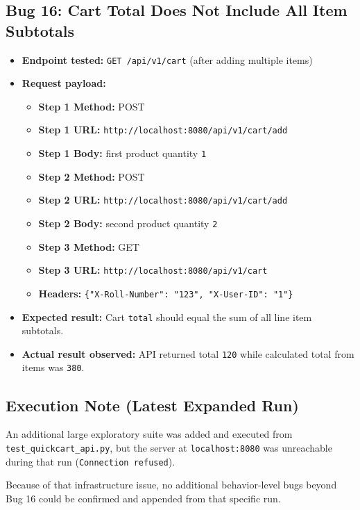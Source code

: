 ﻿\documentclass[11pt,a4paper]{article}
\begin{document}
\subsection*{Bug 16: Cart Total Does Not Include All Item Subtotals}
\begin{itemize}
  \item \textbf{Endpoint tested:} \texttt{GET /api/v1/cart} (after adding multiple items)
  \item \textbf{Request payload:}
  \begin{itemize}
    \item \textbf{Step 1 Method:} POST
    \item \textbf{Step 1 URL:} \texttt{http://localhost:8080/api/v1/cart/add}
    \item \textbf{Step 1 Body:} first product quantity \texttt{1}
    \item \textbf{Step 2 Method:} POST
    \item \textbf{Step 2 URL:} \texttt{http://localhost:8080/api/v1/cart/add}
    \item \textbf{Step 2 Body:} second product quantity \texttt{2}
    \item \textbf{Step 3 Method:} GET
    \item \textbf{Step 3 URL:} \texttt{http://localhost:8080/api/v1/cart}
    \item \textbf{Headers:} \texttt{\{"X-Roll-Number": "123", "X-User-ID": "1"\}}
  \end{itemize}
  \item \textbf{Expected result:} Cart \texttt{total} should equal the sum of all line item subtotals.
  \item \textbf{Actual result observed:} API returned total \texttt{120} while calculated total from items was \texttt{380}.
\end{itemize}

\subsection*{Execution Note (Latest Expanded Run)}
An additional large exploratory suite was added and executed from \texttt{test_quickcart_api.py}, but the server at \texttt{localhost:8080} was unreachable during that run (\texttt{Connection refused}).

Because of that infrastructure issue, no additional behavior-level bugs beyond Bug 16 could be confirmed and appended from that specific run.
\end{document}

